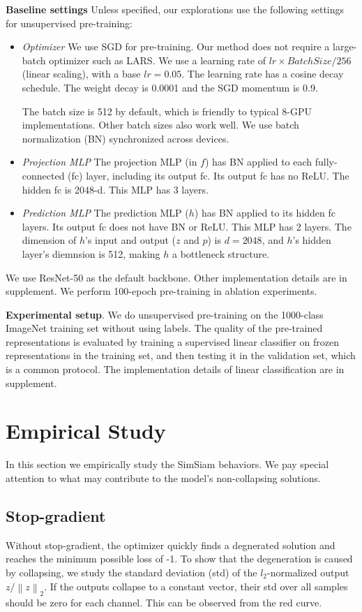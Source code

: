 \documentclass[conference]{IEEEtran}
\begin{document}
\textbf{Baseline settings} Unless specified, our explorations use the following settings for unsupervised pre-training:
\begin{itemize}
    \item \textit{Optimizer} We use SGD for pre-training. Our method does not require a large-batch optimizer such as LARS. We use a learning rate of $lr \times BatchSize/256$ (linear scaling), with a base $lr=0.05$. The learning rate has a cosine decay schedule. The weight decay is 0.0001 and the SGD momentum is 0.9.
    
    The batch size is 512 by default, which is friendly to typical 8-GPU implementations. Other batch sizes also work well. We use batch normalization (BN) synchronized across devices.
    \item \textit{Projection MLP} The projection MLP (in $f$) has BN applied to each fully-connected (fc) layer, including its output fc. Its output fc has no ReLU. The hidden fc is 2048-d. This MLP has 3 layers.
    \item \textit{Prediction MLP} The prediction MLP ($h$) has BN applied to its hidden fc layers. Its output fc does not have BN or ReLU. This MLP has 2 layers. The dimension of $h$'s input and output ($z$ and $p$) is $ d = 2048$, and $h$'s hidden layer's diemnsion is 512, making $h$ a bottleneck structure.
\end{itemize}
We use ResNet-50 as the default backbone. Other implementation details are in supplement. We perform 100-epoch pre-training in ablation experiments.

\textbf{Experimental setup}. We do unsupervised pre-training on the 1000-class ImageNet training set without using labels. The quality of the pre-trained representations is evaluated by training a supervised linear classifier on frozen representations in the training set, and then testing it in the validation set, which is a common protocol.
The implementation details of linear classification are in supplement.

\section{Empirical Study}
In this section we empirically study the SimSiam behaviors. We pay special attention to what may contribute to the model's non-collapsing solutions.

\subsection{Stop-gradient}
Without stop-gradient, the optimizer quickly finds a degnerated solution and reaches the minimum possible loss of -1. To show that the degeneration is caused by collapsing, we study the standard deviation (std) of the $l_2$-normalized output $z/\left\lVert z \right\rVert_2$. 
If the outputs collapse to a constant vector, their std over all samples should be zero for each channel. This can be observed from the red curve.
\end{document}
